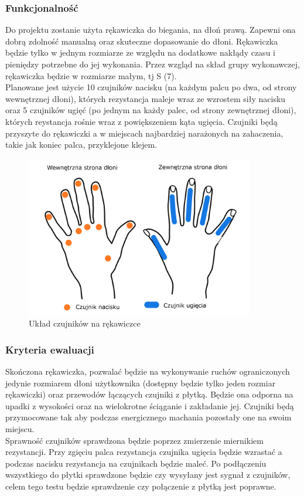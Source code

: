 \documentclass{article}
\begin{document}
\subsubsection{Funkcjonalność}
Do projektu zostanie użyta rękawiczka do biegania, na dłoń prawą. Zapewni ona dobrą zdolność manualną oraz skuteczne dopasowanie do dłoni. Rękawiczka będzie tylko w jednym rozmiarze ze względu na dodatkowe nakłądy czasu i pieniędzy potrzebne do jej wykonania. Przez wzgląd na skład grupy wykonawczej, rękawiczka będzie w rozmiarze małym, tj S (7).\\
Planowane jest użycie 10 czujników nacisku (na każdym palcu po dwa, od strony wewnętrznej dłoni), których rezystancja maleje wraz ze wzrostem siły nacisku oraz 5 czujników ugięć (po jednym na każdy palec, od strony zewnętrznej dłoni), których reystancja rośnie wraz z powiększeniem kąta ugięcia. Czujniki będą przyszyte do rękawiczki a w miejscach najbardziej narażonych na zahaczenia, takie jak koniec palca, przyklejone klejem. \\

\begin{figure}[h!]
\centering
\includegraphics[width = 10cm]{czujniki.png}
\caption{Układ czujników na rękawiczce}
\label{fig:rozmieszczenie_czujników}
\end{figure}

\subsubsection{Kryteria ewaluacji}
Skończona rękawiczka, pozwalać będzie na wykonywanie ruchów ograniczonych jedynie rozmiarem dłoni użytkownika (dostępny będzie tylko jeden rozmiar rękawiczki) oraz przewodów łączących czujniki z płytką. Będzie ona odporna na upadki z wysokości oraz na wielokrotne ściąganie i zakładanie jej. Czujniki będą przymocowane tak aby podczas energicznego machania pozostały one na swoim miejscu.\\
Sprawność czujników sprawdzona będzie poprzez zmierzenie miernikiem rezystancji. Przy zgięciu palca rezystancja czujnika ugięcia będzie wzrastać a podczas nacisku rezystancja na czujnikach będzie maleć. Po podłączeniu wszystkiego do płytki sprawdzone będzie czy wysyłany jest sygnał z czujników, celem tego testu będzie sprawdzenie czy połączenie z płytką jest poprawne.
\end{document}
